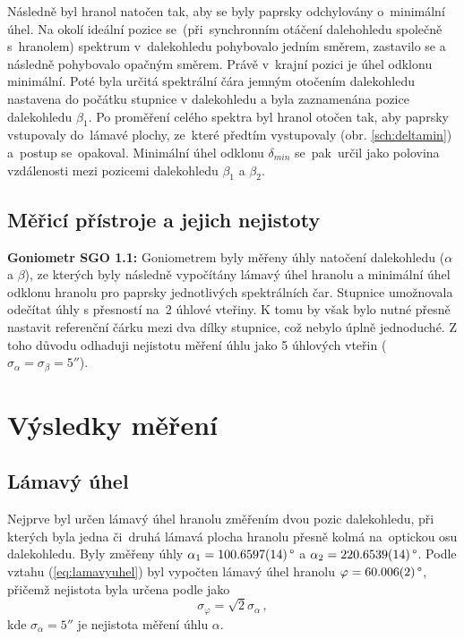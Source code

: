 \documentclass{../concepts/titul_protokol_p/prepareprotokol} %
\begin{document}
Následně byl hranol natočen tak, aby se byly paprsky odchylovány o~minimální úhel.
Na okolí ideální pozice se~(při~synchronním otáčení dalehohledu společně s~hranolem) 
spektrum v~dalekohledu pohybovalo jedním směrem, zastavilo se a následně pohybovalo
opačným směrem. Právě v~krajní pozici je úhel odklonu minimální. Poté byla určitá 
spektrální čára jemným otočením dalekohledu nastavena do počátku stupnice v dalekohledu
a byla zaznamenána pozice dalekohledu $\beta_1$. Po proměření celého
spektra byl hranol otočen tak, aby paprsky vstupovaly do~lámavé plochy, ze~které 
předtím vystupovaly (obr. \ref{sch:deltamin}) a~postup se~opakoval. Minimální
úhel odklonu $\delta_{min}$ se~pak~určil jako polovina vzdálenosti mezi pozicemi
dalekohledu $\beta_1$ a $\beta_2$.


\subsection{Měřicí přístroje a jejich nejistoty}
    
    \textbf{Goniometr SGO 1.1:} Goniometrem byly měřeny úhly natočení dalekohledu ($\alpha$ a $\beta$), ze kterých 
    byly následně vypočítány lámavý úhel hranolu a minimální úhel odklonu hranolu pro 
    paprsky jednotlivých spektrálních čar. Stupnice umožnovala odečítat úhly s přesností 
    na~2 úhlové vteřiny. K tomu by však bylo nutné přesně nastavit referenční čárku 
    mezi dva dílky stupnice, což nebylo úplně jednoduché. Z toho důvodu odhaduji nejistotu 
    měření úhlu jako 5 úhlových vteřin ($\sigma_{\alpha} = \sigma_{\beta} = 5\unit{\arcsecond}$).



\section{Výsledky měření}

\subsection{Lámavý úhel}
Nejprve byl určen lámavý úhel hranolu změřením dvou pozic dalekohledu,
při kterých byla jedna či~druhá lámavá plocha hranolu přesně kolmá
na~optickou osu dalekohledu. Byly změřeny úhly 
$\alpha_1 = 100.6597(14) \,\degree$ a $\alpha_2 = 220.6539(14) \,\degree$.
Podle vztahu (\ref{eq:lamavyuhel}) byl vypočten lámavý úhel hranolu
$\varphi = 60.006(2) \,\degree$, přičemž nejistota byla určena podle 
\cite{englich} jako
\begin{equation}\label{sigmaphi}
    \sigma_{\varphi} = \sqrt{2} \sigma_{\alpha} \, ,
\end{equation}
kde $\sigma_{\alpha} = 5\unit{\arcsecond}$ je nejistota měření úhlu $\alpha$.
\end{document}
